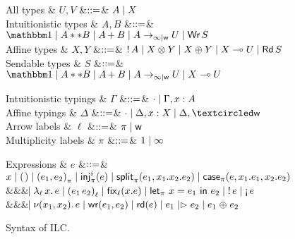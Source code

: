 \begin{figure*}[t]
  \centering
  \begin{minipage}{.58\textwidth}
    \centering
    \begin{grammar}
        All types
      & $U, V$
        &$\mathrel{::=}$& $A \mathrel{\mid} X$
      \\      
      Intuitionistic types
      & $A,B$
      &$\mathrel{::=}$& $\tyUnit \bnfalt A ** B \bnfalt \tySum{A}{}{B} \bnfalt
      \tyArr{A}{\infty \mid \wm}{U} \bnfalt \tyWr{S}$
      \\
      Affine types
      & $X,Y$
      &$\mathrel{::=}$& ${!}\,{A} \mathrel{\mid}
      {X}\otimes{Y} \mathrel{\mid} {X}\oplus{Y} \mathrel{\mid} X \multimap U \mathrel{\mid} \textnormal{\textsf{Rd}}\,S$
      \\
      Sendable types
      & $S$
      &$\mathrel{::=}$& $\tyUnit \bnfalt A ** B \bnfalt \tySum{A}{}{B} \bnfalt
      \tyArr{A}{\infty \mid \wm}{U} \bnfalt X \multimap U$
    \end{grammar}      
  \end{minipage}%
  \begin{minipage}{.42\textwidth}
    \centering
    \begin{grammar}
      Intuitionistic typings
      & $\Gamma$
      &$\mathrel{::=}$& $\cdot \mathrel{\mid} \Gamma,x:A$
      \\
      Affine typings
      & $\Delta$
      &$\mathrel{::=}$& $\emptyctxt \bnfalt \Delta,x:X \bnfalt \Delta, \wrtok$
      \\
      Arrow labels
      & $\ell$
      &$\mathrel{::=}$& $\pi \mathrel{\mid} \textsf{w}$
      \\            
      Multiplicity labels
      & $\pi$
      &$\mathrel{::=}$& $1 \mathrel{\mid} \infty$
    \end{grammar}    
  \end{minipage}
  \begin{grammar}
    Expressions
    & $e$
    &$\mathrel{::=}$&
    $\eVar{x} \bnfalt \eUnit \bnfalt \ePair{e_1}{e_2}{\pi} \bnfalt \eInj{i}{e}
    \bnfalt \eSplit{e_1}{x_1}{x_2}{e_2} \bnfalt
    \eCase{\pi}{e}{x_1}{e_1}{x_2}{e_2}$
    \\ &&& $\hspace{-1.02ex}\mathrel{\mid} \lambda_{\ell}\,{x}.\,{e} \mathrel{\mid} \mathsf{(} e_1\,e_2\mathsf{)}_{\ell} \mathrel{\mid} \textnormal{\textsf{fix}}_{\ell}\mathsf{(}{x}.{e}\mathsf{)}
    \mathrel{\mid} \textnormal{\textsf{let}}_{\pi}\ {x} = {e_1}\ \textnormal{\textsf{in}}\ {e_2} \mathrel{\mid} {!}\,{e} \mathrel{\mid} \textnormal{!`}\,{e}$
    \\ &&& $\hspace{-1.02ex}\mathrel{\mid} \nu(x_1,x_2).\,e \mathrel{\mid} \textnormal{\textsf{wr}}\mathsf{(}{e_1},{e_2}\mathsf{)}
    \mathrel{\mid} \textnormal{\textsf{rd}}\mathsf{(}{e}\mathsf{)} \mathrel{\mid} e_1 \mathrel{|\rhd} e_2 \mathrel{\mid} e_1 \mathrel{\oplus} e_2$
  \end{grammar}      
  \caption{Syntax of ILC.}
  \label{fig:ilc-syntax}
\end{figure*}
